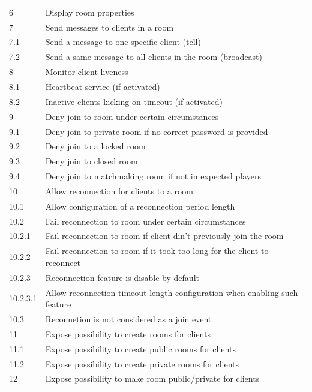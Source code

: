 \begin{center}
\begin{longtable}{|l|l|}
6        & Display room properties \\
7        & Send messages to clients in a room \\
7.1      & Send a message to one specific client (tell) \\
7.2      & Send a same message to all clients in the room (broadcast) \\
8        & Monitor client liveness \\
8.1      & Heartbeat service (if activated) \\
8.2      & Inactive clients kicking on timeout (if activated) \\
9        & Deny join to room under certain circumstances \\
9.1      & Deny join to private room if no correct password is provided \\
9.2      & Deny join to a locked room \\
9.3      & Deny join to closed room \\
9.4      & Deny join to matchmaking room if not in expected players \\
10        & Allow reconnection for clients to a room \\
10.1      & Allow configuration of a reconnection period length \\
10.2      & Fail reconnection to room under certain circumstances \\
10.2.1    & Fail reconnection to room if client din't previously join the room \\
10.2.2    & Fail reconnection to room if it took too long for the client to reconnect \\
10.2.3    & Reconnection feature is disable by default \\
10.2.3.1  & Allow reconnection timeout length configuration when enabling such feature \\
10.3      & Reconnetion is not considered as a join event \\
11        & Expose possibility to create rooms for clients \\
11.1      & Expose possibility to create public rooms for clients \\
11.2      & Expose possibility to create private rooms for clients \\
12        & Expose possibility to make room public/private for clients \\
\hline

  \end{longtable}
\end{center}

